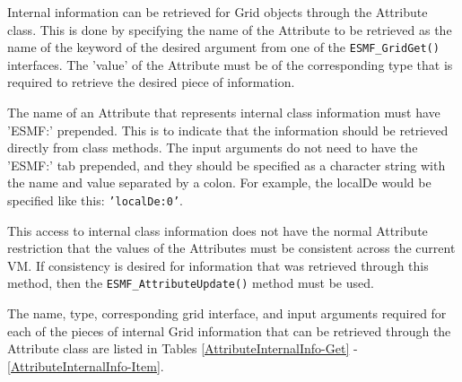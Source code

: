 
\label{sec:InternalInfo}

Internal information can be retrieved for Grid objects through the Attribute 
class.  This is done by specifying the name of the Attribute to be retrieved
as the name of the keyword of the desired argument from one of the {\tt ESMF\_GridGet()}
interfaces.  The 'value' of the Attribute must be of the corresponding type
that is required to retrieve the desired piece of information.

The name of an Attribute that represents internal class information must have 
'ESMF:' prepended.  This is to indicate that the information should be retrieved
directly from class methods.  The input arguments do not need to have the 'ESMF:'
tab prepended, and they should be specified as a character string with the name
and value separated by a colon.  For example, the localDe would be specified 
like this: {\tt 'localDe:0'}.

This access to internal class information does not
have the normal Attribute restriction that the values of the Attributes must be
consistent across the current VM.  If consistency is desired for information that
was retrieved through this method, then the {\tt ESMF\_AttributeUpdate()} method
must be used.

The name, type, corresponding grid interface, and input arguments required for each of 
the pieces of internal
Grid information that can be retrieved through the Attribute class are listed
in Tables \ref{AttributeInternalInfo-Get} - \ref{AttributeInternalInfo-Item}.

